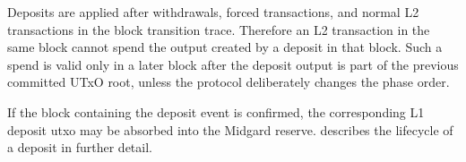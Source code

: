 \documentclass[../midgard.tex]{subfiles}
\begin{document}
Deposits are applied after withdrawals, forced transactions, and normal L2 transactions in the block transition trace.
Therefore an L2 transaction in the same block cannot spend the output created by a deposit in that block.
Such a spend is valid only in a later block after the deposit output is part of the previous committed UTxO root, unless the protocol deliberately changes the phase order.

If the block containing the deposit event is confirmed, the corresponding L1 deposit utxo may be absorbed into the Midgard reserve.
 describes the lifecycle of a deposit in further detail.
\end{document}

